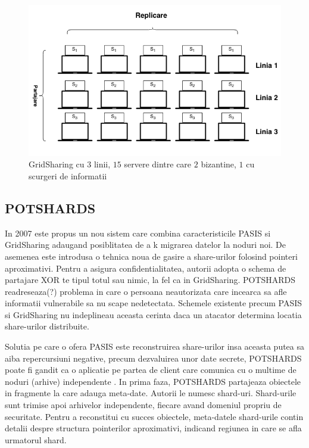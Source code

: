 \documentclass{llncs}
\begin{document}
\begin{figure}
	\includegraphics[width=12cm]{img/GridSharing.png}    %
	\caption{GridSharing cu $3$ linii, $15$ servere dintre care $2$ bizantine, $1$ cu scurgeri de informatii}
	\label{fig:grid_sharing}
	\bigskip
\end{figure}

\subsection{POTSHARDS} 
\label{sec:desc_potshards}
In 2007 este propus un nou sistem care combina caracteristicile PASIS si GridSharing adaugand posiblitatea de a k migrarea datelor la noduri noi.
De asemenea este introdusa o tehnica noua de gasire a share-urilor folosind pointeri aproximativi. Pentru a asigura confidentialitatea, autorii adopta o schema de partajare XOR te tipul totul sau nimic, la fel ca in GridSharing.
POTSHARDS readreseaza(?) problema in care o persoana neautorizata care incearca sa afle informatii vulnerabile sa nu scape nedetectata. Schemele existente precum PASIS si GridSharing nu indeplineau aceasta cerinta daca un atacator determina locatia share-urilor distribuite.

Solutia pe care o ofera PASIS este reconstruirea share-urilor insa aceasta putea sa aiba repercursiuni negative, precum dezvaluirea unor date secrete,
POTSHARDS poate fi gandit ca o aplicatie pe partea de client care comunica cu o multime de noduri (arhive) independente . In prima faza, POTSHARDS partajeaza obiectele in fragmente la care adauga meta-date. Autorii le numesc shard-uri. Shard-urile sunt trimise apoi arhivelor independente, fiecare avand domeniul propriu de securitate. Pentru a reconstitui cu succes obiectele, meta-datele shard-urile contin detalii despre structura pointerilor aproximativi, indicand regiunea in care se afla urmatorul shard.
\end{document}

